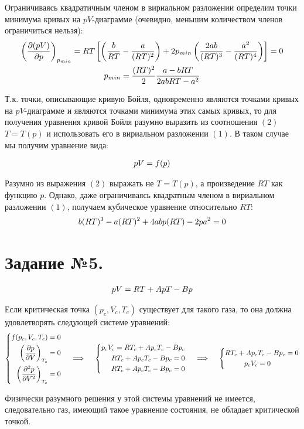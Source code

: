 \documentclass[a4paper]{article}
\begin{document}
Ограничиваясь квадратичным членом в вириальном разложении определим точки минимума кривых на $pV$-диаграмме (очевидно, меньшим количеством членов ограничиться нельзя):
\begin{gather}
\left( \frac{\partial (pV)}{\partial p} \right)_{p_{min}} = RT \left[ \left( \frac{b}{RT} - \frac{a}{(RT)^2} \right) + 2 p_{min} \left( \frac{2ab}{(RT)^3} - \frac{a^2}{(RT)^4} \right) \right] = 0 \notag \\
p_{min} = \frac{(RT)^2}{2} \frac{a - bRT}{2abRT - a^2}
\end{gather}

Т.к. точки, описывающие кривую Бойля, одновременно являются точками кривых на $pV$-диаграмме и являются точками минимума этих самых кривых, то для получения уравнения кривой Бойля разумно выразить из соотношения $(2)$ $T = T(p)$ и использовать его в вириальном разложении $(1)$. В таком случае мы получим уравнение вида:

\begin{gather}
pV = f(p) \notag
\end{gather}

Разумно из выражения $(2)$ выражать не $T = T(p)$, а произведение $RT$ как функцию $p$. Однако, даже ограничиваясь квадратным членом в вириальном разложении $(1)$, получаем кубическое уравнение относительно $RT$:
\begin{gather}
b(RT)^3 - a(RT)^2 + 4abp(RT) - 2pa^2 = 0 \notag
\end{gather}

\section{Задание №5.}
\begin{gather}
pV = RT + ApT - Bp \notag
\end{gather}

Если критическая точка $(p_c, V_c, T_c)$ существует для такого газа, то она должна удовлетворять следующей системе уравнений:
\begin{gather}
\left\{
\begin{aligned}
f(p_c, V_c, T_c) = 0 \\
\left( \frac{\partial p}{\partial V} \right)_{T_c} = 0 \\
\left( \frac{\partial^2 p}{\partial V^2} \right)_{T_c} = 0
\end{aligned}
\right. 
\quad 
\implies
\quad 
\left\{
\begin{aligned}
p_c V_c = RT_c + A p_c T_c - B p_c \\
R T_c + A p_c T_c - B p_c = 0 \\
R T_c + A p_c T_c - B p_c = 0
\end{aligned}
\right.
\quad
\implies
\quad
\left\{
\begin{aligned}
R T_c + A p_c &T_c - B p_c = 0 \\
p_c V_c &= 0
\end{aligned}
\right. 
\notag
\end{gather}

Физически разумного решения у этой системы уравнений не имеется, следовательно газ, имеющий такое уравнение состояния, не обладает критической точкой.
\end{document}
